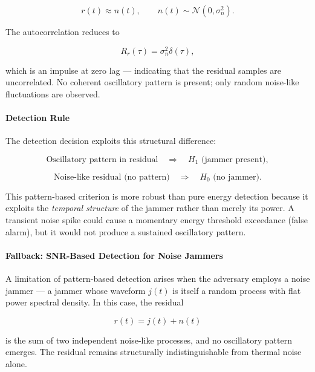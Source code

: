 \documentclass{article}
\begin{document}
\begin{equation}
r(t) \approx n(t), \qquad n(t) \sim \mathcal{N}(0, \sigma_n^2).
\end{equation}

The autocorrelation reduces to

\begin{equation}
R_r(\tau) = \sigma_n^2 \delta(\tau),
\end{equation}

which is an impulse at zero lag — indicating that the residual samples are uncorrelated. No coherent oscillatory pattern is present; only random noise-like fluctuations are observed.

\paragraph{Detection Rule}

The detection decision exploits this structural difference:

\begin{equation}
\text{Oscillatory pattern in residual} \quad \Rightarrow \quad H_1 \text{ (jammer present)},
\end{equation}

\begin{equation}
\text{Noise-like residual (no pattern)} \quad \Rightarrow \quad H_0 \text{ (no jammer)}.
\end{equation}

This pattern-based criterion is more robust than pure energy detection because it exploits the \emph{temporal structure} of the jammer rather than merely its power. A transient noise spike could cause a momentary energy threshold exceedance (false alarm), but it would not produce a sustained oscillatory pattern.

\paragraph{Fallback: SNR-Based Detection for Noise Jammers}

A limitation of pattern-based detection arises when the adversary employs a noise jammer — a jammer whose waveform $j(t)$ is itself a random process with flat power spectral density. In this case, the residual

\begin{equation}
r(t) = j(t) + n(t)
\end{equation}

is the sum of two independent noise-like processes, and no oscillatory pattern emerges. The residual remains structurally indistinguishable from thermal noise alone.
\end{document}
